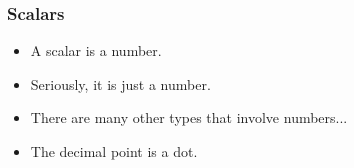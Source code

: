 \documentclass[12pt]{beamer}
\begin{document}
\begin{frame}
  \frametitle{Scalars}
  \begin{itemize}
  \item A scalar is a number.
    \pause
  \item Seriously, it is just a number.
  \item There are many other types that involve numbers...
  \item The decimal point is a dot.
  \end{itemize}
  \testcode
\end{frame}
\end{document}
